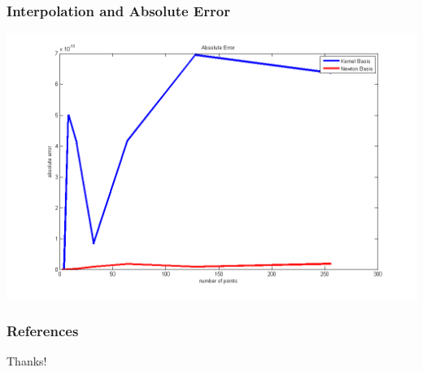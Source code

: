 \documentclass{beamer}
\begin{document}
\begin{frame}
\frametitle{Interpolation and Absolute Error}
\includegraphics[scale =.45]{functionError}
\end{frame}

\begin{frame}\frametitle{References}

\end{frame}


\begin{frame}
\Huge{\centerline{Thanks!}}
\end{frame}

\end{document}
